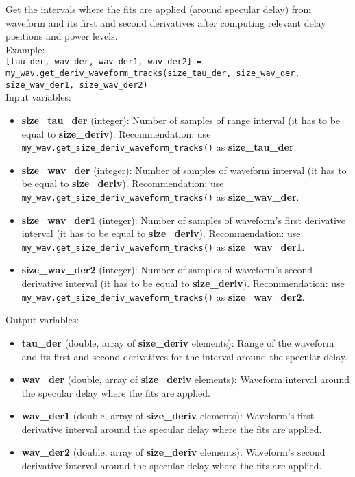 Get the intervals where the fits are applied (around specular delay) from waveform and its first and second derivatives after computing relevant delay positions and power levels.\\

Example:\\

\texttt{[tau\_der, wav\_der, wav\_der1, wav\_der2] = my\_wav.get\_deriv\_waveform\_tracks(size\_tau\_der, size\_wav\_der, size\_wav\_der1, size\_wav\_der2)}\\

Input variables:
\begin{itemize}
\item {\bf size\_tau\_der} (integer): Number of samples of range interval (it has to be equal to {\bf size\_deriv}). Recommendation: use \texttt{my\_wav.get\_size\_deriv\_waveform\_tracks()} as {\bf size\_tau\_der}.
\item {\bf size\_wav\_der} (integer): Number of samples of waveform interval (it has to be equal to {\bf size\_deriv}). Recommendation: use \texttt{my\_wav.get\_size\_deriv\_waveform\_tracks()} as {\bf size\_wav\_der}.
\item {\bf size\_wav\_der1} (integer): Number of samples of waveform's first derivative interval (it has to be equal to {\bf size\_deriv}). Recommendation: use \texttt{my\_wav.get\_size\_deriv\_waveform\_tracks()} as {\bf size\_wav\_der1}.
\item {\bf size\_wav\_der2} (integer): Number of samples of waveform's second derivative interval (it has to be equal to {\bf size\_deriv}). Recommendation: use \texttt{my\_wav.get\_size\_deriv\_waveform\_tracks()} as {\bf size\_wav\_der2}.
\end{itemize}

Output variables:
\begin{itemize}
\item {\bf tau\_der} (double, array of {\bf size\_deriv} elements): Range of the waveform and its first and second derivatives for the interval around the specular delay.
\item {\bf wav\_der} (double, array of {\bf size\_deriv} elements): Waveform interval around the specular delay where the fits are applied.
\item {\bf wav\_der1} (double, array of {\bf size\_deriv} elements): Waveform's first derivative interval around the specular delay where the fits are applied.
\item {\bf wav\_der2} (double, array of {\bf size\_deriv} elements): Waveform's second derivative interval around the specular delay where the fits are applied.
\end{itemize}


